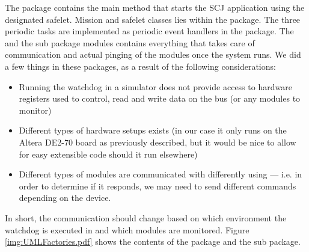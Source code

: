The  package contains the main method that starts the SCJ application using the designated safelet. Mission and safelet classes lies within the  package. The three periodic tasks are implemented as periodic event handlers in the  package.
The  and the sub package modules contains everything that takes care of \iic communication and actual pinging of the modules once the system runs. We did a few things in these packages, as a result of the following considerations:
\begin{itemize}
    \item Running the watchdog in a simulator does not provide access to hardware registers used to control, read and write data on the \iic bus (or any modules to monitor)
    \item Different types of hardware setups exists (in our case it only runs on the Altera DE2-70 board as previously described, but it would be nice to allow for easy extensible code should it run elsewhere)
    \item Different types of modules are communicated with differently using \iic --- i.e. in order to determine if it responds, we may need to send different commands depending on the device.
\end{itemize}

In short, the communication should change based on which environment the watchdog is executed in and which modules are monitored. Figure \ref{img:UMLFactories.pdf} shows the contents of the  package and the  sub package.


